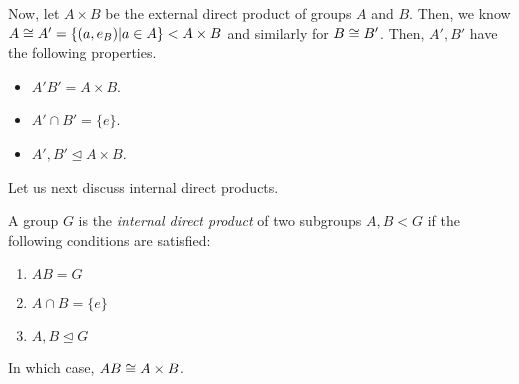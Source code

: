 \documentclass[11pt,leqno,oneside]{amsart}
\newcommand{\subgroup}{\mathrel{<}}
\newcommand{\normsubgroup}{\mathrel{\unlhd}}
\begin{document}
Now, let $A \times B$ be the external direct product of groups $A$ and $B$.
Then, we know $A \isom A' = \{(a,e_B) | a \in A\} \subgroup A \times B$ and
similarly for $B \mathrel{\cong} B'$. Then, $A',B'$ have the following properties.
\begin{itemize}
    \item $A'B' = A \times B$.
    \item $A' \cap B' = \{e\}$.
    \item $A', B' \normsubgroup A \times B$.
\end{itemize}

Let us next discuss internal direct products.

\begin{defn}
    A group $G$ is the \emph{internal direct product} of two subgroups $A,B
    \subgroup G$ if the following conditions are satisfied:
    \begin{enumerate}[label=\roman*)]
        \item $AB = G$
        \item $A \cap B = \{e\}$
        \item $A,B \normsubgroup G$
    \end{enumerate}
\end{defn}
\begin{rmk*}
    In which case, $AB \mathrel{\cong} A \times B$.
\end{rmk*}
\end{document}
